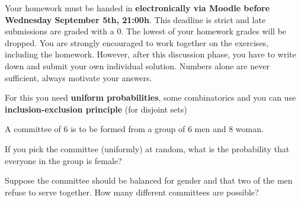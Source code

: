 \documentclass[a4paper,10pt,landscape,twocolumn]{scrartcl}
\newcommand\deadline{Wednesday September 5th, 21:00h}
\begin{document}
\homeworkproblems

{\sffamily\noindent
Your homework must be handed in \textbf{electronically via Moodle before \deadline}. This deadline is strict and late submissions are graded with a 0. The lowest of your homework grades will be dropped. You are strongly encouraged to work together on the exercises, including the homework. However, after this discussion phase, you have to write down and submit your own individual solution. Numbers alone are never sufficient, always motivate your answers.
}

	
\begin{exercise}[Committees (3pt)]
	\begin{mycomment}
		For this you need \textbf{uniform probabilities}, some combinatorics and you can use \textbf{inclusion-exclusion principle} (for disjoint sets)
	\end{mycomment}

	A committee of 6 is to be formed from a group of 6 men and 8 woman.

	\begin{subex}[1pt]
	If you pick the committee (uniformly) at random, what is the probability that everyone in the group is female?
	\end{subex}

	\begin{subex}[2pt]
		Suppose the committee should be balanced for gender and that two of the men refuse to serve together. How many different committees are possible?
	\end{subex}
\end{exercise}
\end{document}
